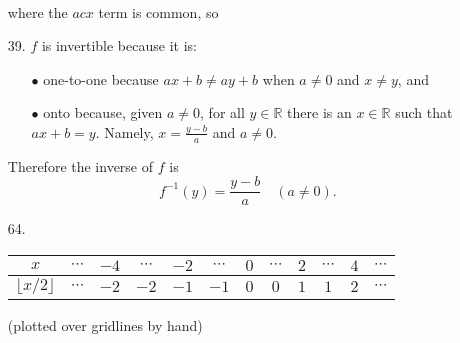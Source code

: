\documentclass{article}
\begin{document}
\begin{enumerate}
\begin{align*}
        \end{align*}
        where the $acx$ term is common, so 
    \item[39.] $f$ is invertible because it is:
        \begin{itemize}
            \item[$\bullet$] one-to-one because $ax+b \neq ay+b$ when $a \neq 0$ and $x \neq y$, and
            \item[$\bullet$] onto because, given $a \neq 0$, for all $y \in \mathbb{R}$ there is an $x \in \mathbb{R}$ such that $ax+b=y$. Namely, $x = \frac{y-b}{a}$ and $a \neq 0$.
        \end{itemize}
        Therefore the inverse of $f$ is
        \[
        f^{-1}(y) = \frac{y-b}{a} \quad (a \neq 0).
        \]
    \item[64.] \hfill
        \begin{flushleft}
            \begin{tabular}{c|ccccccccccc}
                $x$ & $\cdots$ & $-4$ & $\cdots$ & $-2$ & $\cdots$ & $0$ & $\cdots$ & $2$ & $\cdots$ & $4$ & $\cdots$ \\\hline
                $\lfloor x/2 \rfloor$ & $\cdots$ & $-2$ & $-2$ & $-1$ & $-1$ & $0$ & $0$ & $1$ & $1$ & $2$ & $\cdots$
            \end{tabular}
        \end{flushleft}
        \begin{center}
        \end{center}
        \begin{flushright}
        (plotted over gridlines by hand)
        \end{flushright}
\end{enumerate}
\end{document}
